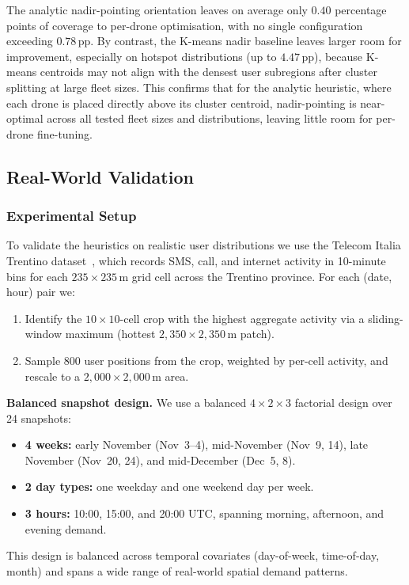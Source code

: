 \documentclass[conference]{IEEEtran}
\begin{document}
The analytic nadir-pointing orientation leaves on average only $0.40$ percentage points of coverage to per-drone optimisation, with no single configuration exceeding $0.78$\,pp.
By contrast, the K-means nadir baseline leaves larger room for improvement, especially on hotspot distributions (up to $4.47$\,pp), because K-means centroids may not align with the densest user subregions after cluster splitting at large fleet sizes.
This confirms that for the analytic heuristic, where each drone is placed directly above its cluster centroid, nadir-pointing is near-optimal across all tested fleet sizes and distributions, leaving little room for per-drone fine-tuning.

\subsection{Real-World Validation}
\label{sec:results_telecom}

\subsubsection{Experimental Setup}

To validate the heuristics on realistic user distributions we use the Telecom Italia
Trentino dataset~\cite{barlacchi2015}, which records SMS, call,  and internet activity
in 10-minute bins for each $235 \times 235$\,m grid cell across the Trentino
province. For each (date, hour) pair we:
\begin{enumerate}[label=(\alph*)]
    \item Identify the $10 \times 10$-cell crop with the highest aggregate activity
          via a sliding-window maximum (hottest $2{,}350 \times 2{,}350$\,m patch).
    \item Sample 800 user positions from the crop, weighted by per-cell activity,
          and rescale to a $2{,}000 \times 2{,}000$\,m area.
\end{enumerate}

\textbf{Balanced snapshot design.}
We use a balanced $4 \times 2 \times 3$ factorial design over 24 snapshots:
\begin{itemize}
    \item \textbf{4 weeks:} early November (Nov~3--4), mid-November (Nov~9, 14), late November (Nov~20, 24), and mid-December (Dec~5, 8).
    \item \textbf{2 day types:} one weekday and one weekend day per week.
    \item \textbf{3 hours:} 10:00, 15:00, and 20:00 UTC, spanning morning, afternoon, and evening demand.
\end{itemize}
This design is balanced across temporal covariates (day-of-week, time-of-day, month) and spans a wide range of real-world spatial demand patterns.
\end{document}
